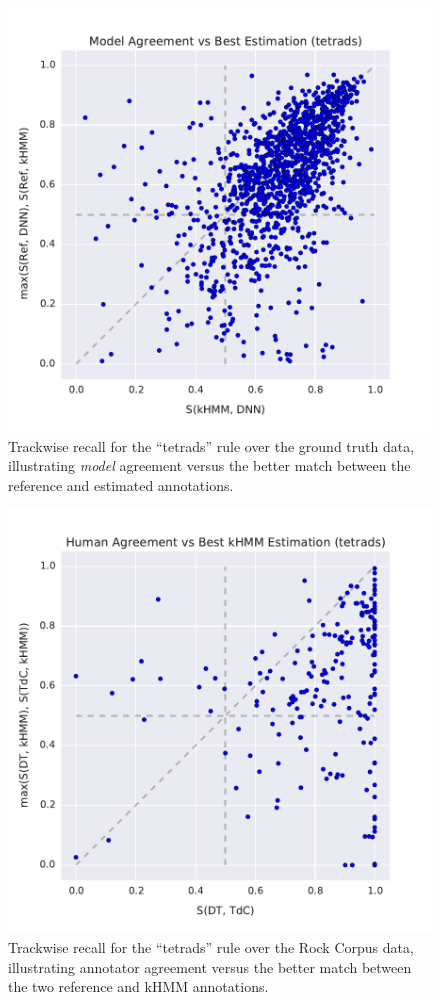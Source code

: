\documentclass{article}
\begin{document}
\begin{figure}[!t]
\centering
\includegraphics[width=\columnwidth]{model_agreement-vs-best_est}
\caption{Trackwise recall for the ``tetrads'' rule over the ground truth data, illustrating \emph{model} agreement versus the better match between the reference and estimated annotations.}
\label{fig:model_agreement}
\end{figure}

\begin{figure}[!t]
\centering
\includegraphics[width=\columnwidth]{human_agreement-vs-best_kHMM_est}
\caption{Trackwise recall for the ``tetrads'' rule over the Rock Corpus data, illustrating annotator agreement versus the better match between the two reference and kHMM annotations.}
\label{fig:annotator_agreement}
\end{figure}
\end{document}
